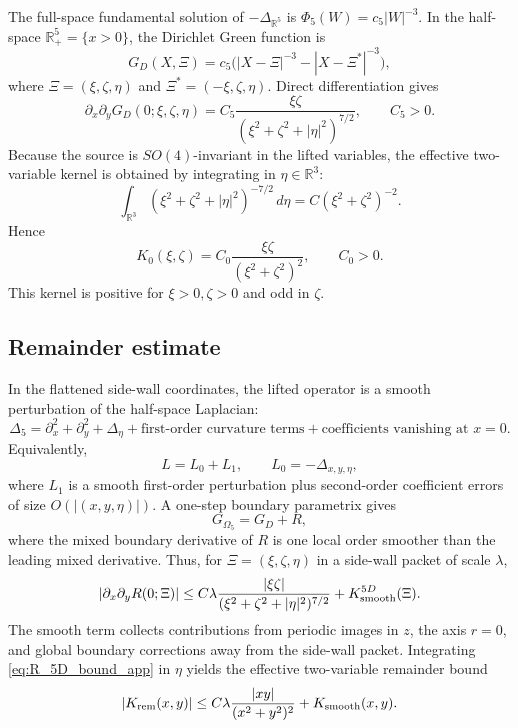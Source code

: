 \documentclass[11pt]{amsart}
\begin{document}
The full-space fundamental solution of \(-\Delta_{\mathbb R^5}\) is \(\Phi_5(W)=c_5|W|^{-3}\).  In the half-space \(\mathbb R^5_+=\{x>0\}\), the Dirichlet Green function is
\[
G_D(X,\Xi)=c_5\bigl(|X-\Xi|^{-3}-|X-\Xi^*|^{-3}\bigr),
\]
where \(\Xi=(\xi,\zeta,\eta)\) and \(\Xi^*=(-\xi,\zeta,\eta)\).  Direct differentiation gives
\begin{equation}\label{eq:5D_mixed_kernel_app}
\partial_x\partial_yG_D(0;\xi,\zeta,\eta)
=
C_5\frac{\xi\zeta}{(\xi^2+\zeta^2+|\eta|^2)^{7/2}},
\qquad C_5>0.
\end{equation}
Because the source is \(SO(4)\)-invariant in the lifted variables, the effective two-variable kernel is obtained by integrating in \(\eta\in\mathbb R^3\):
\[
\int_{\mathbb R^3}
(\xi^2+\zeta^2+|\eta|^2)^{-7/2}\,d\eta
=C(\xi^2+\zeta^2)^{-2}.
\]
Hence
\begin{equation}\label{eq:effective_kernel_app}
K_0(\xi,\zeta)
=C_0\frac{\xi\zeta}{(\xi^2+\zeta^2)^2},
\qquad C_0>0.
\end{equation}
This kernel is positive for \(\xi>0,\zeta>0\) and odd in \(\zeta\).

\subsection{Remainder estimate}

In the flattened side-wall coordinates, the lifted operator is a smooth perturbation of the half-space Laplacian:
\[
\Delta_5
=
\partial_x^2+\partial_y^2+\Delta_\eta
+\text{first-order curvature terms}
+\text{coefficients vanishing at }x=0.
\]
Equivalently,
\[
L=L_0+L_1,
\qquad
L_0=-\Delta_{x,y,\eta},
\]
where \(L_1\) is a smooth first-order perturbation plus second-order coefficient errors of size \(O(|(x,y,\eta)|)\).  A one-step boundary parametrix gives
\[
G_{\Omega_5}=G_D+R,
\]
where the mixed boundary derivative of \(R\) is one local order smoother than the leading mixed derivative.  Thus, for \(\Xi=(\xi,
\zeta,\eta)\) in a side-wall packet of scale \(\lambda\),
\begin{equation}\label{eq:R_5D_bound_app}
|\partial_x\partial_yR(0;\Xi)|
\le
C\lambda
\frac{|\xi\zeta|}{(\xi^2+\zeta^2+|\eta|^2)^{7/2}}
+K^{5D}_{\rm smooth}(\Xi).
\end{equation}
The smooth term collects contributions from periodic images in \(z\), the axis \(r=0\), and global boundary corrections away from the side-wall packet.  Integrating \eqref{eq:R_5D_bound_app} in \(\eta\) yields the effective two-variable remainder bound
\begin{equation}\label{eq:R_effective_bound_app}
|K_{\rm rem}(x,y)|
\le
C\lambda\frac{|xy|}{(x^2+y^2)^2}+K_{\rm smooth}(x,y).
\end{equation}
\end{document}
